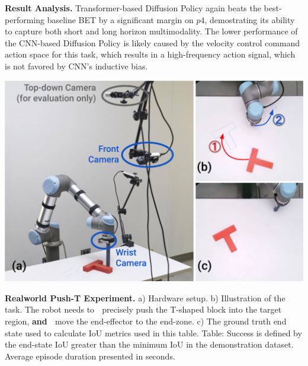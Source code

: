 \textbf{Result Analysis.} Transformer-based Diffusion Policy again beats the best-performing baseline BET \cite{bet} by a significant margin on $p4$, demostrating its ability to capture both short and long horizon multimodality. The lower performance of the CNN-based Diffusion Policy is likely caused by the velocity control command action space for this task, which results in a high-frequency action signal, which is not favored by CNN's inductive bias.

\begin{table}[t]
\centering
\includegraphics[width=0.9\linewidth]{figure/real_task_setup.pdf}

\vspace{2mm}


\caption{\textbf{Realworld Push-T Experiment.} 
\label{tab:real_pusht}
a) Hardware setup.  
b) Illustration of the task. The robot needs to \textcircled{} precisely push the T-shaped block into the target region, \textbf{and} \textcircled{} move the end-effector to the end-zone. 
c) The ground truth end state used to calculate IoU metrics used in this table. Table: Success is defined by the end-state IoU greater than the minimum IoU in the demonstration dataset. Average episode duration presented in seconds.}
\end{table}



